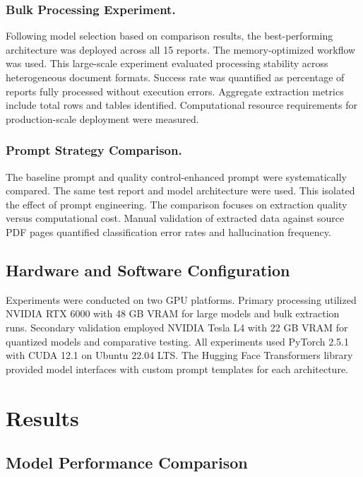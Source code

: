 \documentclass{svproc}
\begin{document}
\subsubsection{Bulk Processing Experiment.}

Following model selection based on comparison results, the best-performing architecture was deployed across all 15 reports. The memory-optimized workflow was used. This large-scale experiment evaluated processing stability across heterogeneous document formats. Success rate was quantified as percentage of reports fully processed without execution errors. Aggregate extraction metrics include total rows and tables identified. Computational resource requirements for production-scale deployment were measured.

\subsubsection{Prompt Strategy Comparison.}

The baseline prompt and quality control-enhanced prompt were systematically compared. The same test report and model architecture were used. This isolated the effect of prompt engineering. The comparison focuses on extraction quality versus computational cost. Manual validation of extracted data against source PDF pages quantified classification error rates and hallucination frequency.

\subsection{Hardware and Software Configuration}

Experiments were conducted on two GPU platforms. Primary processing utilized NVIDIA RTX 6000 with 48 GB VRAM for large models and bulk extraction runs. Secondary validation employed NVIDIA Tesla L4 with 22 GB VRAM for quantized models and comparative testing. All experiments used PyTorch 2.5.1 with CUDA 12.1 on Ubuntu 22.04 LTS. The Hugging Face Transformers library provided model interfaces with custom prompt templates for each architecture.

\section{Results}

\subsection{Model Performance Comparison}
\end{document}
